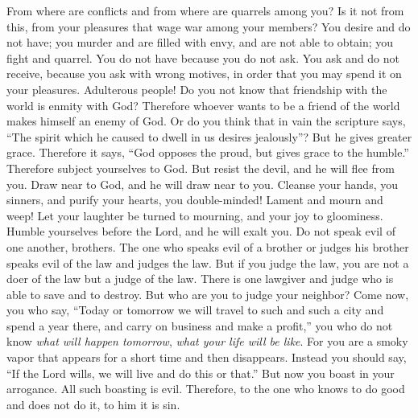 \begin{biblechapter} %
 From where are conflicts and from where are quarrels among you? Is it not from this, from your pleasures that wage war among your members?
\verse You desire and do not have; you murder and are filled with envy, and are not able to obtain; you fight and quarrel. You do not have because you do not ask.
\verse You ask and do not receive, because you ask with wrong motives, in order that you may spend it on your pleasures.
\verse Adulterous people! Do you not know that friendship with the world is enmity with God? Therefore whoever wants to be a friend of the world makes himself an enemy of God.
\verse Or do you think that in vain the scripture says, “The spirit which he caused to dwell in us desires jealously”?
\verse But he gives greater grace. Therefore it says, “God opposes the proud, 
but gives grace to the humble.”
\verse Therefore subject yourselves to God. But resist the devil, and he will flee from you.
\verse Draw near to God, and he will draw near to you. Cleanse your hands, you sinners, and purify your hearts, you double-minded!
\verse Lament and mourn and weep! Let your laughter be turned to mourning, and your joy to gloominess.
\verse Humble yourselves before the Lord, and he will exalt you.
\verse Do not speak evil of one another, brothers. The one who speaks evil of a brother or judges his brother speaks evil of the law and judges the law. But if you judge the law, you are not a doer of the law but a judge of the law.
\verse There is one lawgiver and judge who is able to save and to destroy. But who are you to judge your neighbor?
 Come now, you who say, “Today or tomorrow we will travel to such and such a city and spend a year there, and carry on business and make a profit,”
\verse you who do not know \textit{what will happen tomorrow}, \textit{what your life will be like}. For you are a smoky vapor that appears for a short time and then disappears.
\verse Instead you should say, “If the Lord wills, we will live and do this or that.”
\verse But now you boast in your arrogance. All such boasting is evil.
\verse Therefore, to the one who knows to do good and does not do it, to him it is sin.
\end{biblechapter}

